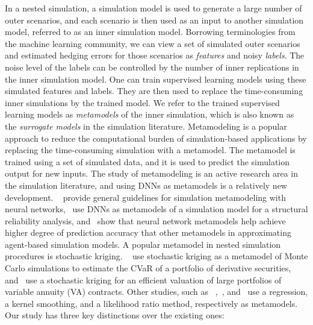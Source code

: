 In a nested simulation, a simulation model is used to generate a large number of outer scenarios, and each scenario is then used as an input to another simulation model, referred to as an inner simulation model.
Borrowing terminologies from the machine learning community, we can view a set of simulated outer scenarios and estimated hedging errors for those scenarios as \textit{features} and noisy \textit{labels}.
The noise level of the labels can be controlled by the number of inner replications in the inner simulation model.
One can train supervised learning models using these simulated features and labels.
They are then used to replace the time-consuming inner simulations by the trained model.
We refer to the trained supervised learning models as \textit{metamodels} of the inner simulation, which is also known as the \textit{surrogate models} in the simulation literature.
Metamodeling is a popular approach to reduce the computational burden of simulation-based applications by replacing the time-consuming simulation with a metamodel.
The metamodel is trained using a set of simulated data, and it is used to predict the simulation output for new inputs.
The study of metamodeling is an active research area in the simulation literature, and using DNNs as metamodels is a relatively new development.
~\cite{fonseca2003simulation} provide general guidelines for simulation metamodeling with neural networks,~\cite{lieu2022adaptive} use DNNs as metamodels of a simulation model for a structural reliability analysis, and~\cite{salle2014efficient} show that neural network metamodels help achieve higher degree of prediction accuracy that other metamodels in approximating agent-based simulation models.
A popular metamodel in nested simulation procedures is stochastic kriging.
~\cite{liu2010stochastic} use stochastic kriging as a metamodel of Monte Carlo simulations to estimate the CVaR of a portfolio of derivative securities, and~\cite{gan2015valuation} use a stochastic kriging for an efficient valuation of large portfolios of variable annuity (VA) contracts.
Other studies, such as ~\cite{broadie2015risk},~\cite{hong2017kernel}, and~\cite{zhang2022sample} use a regression, a kernel smoothing, and a likelihood ratio method, respectively as metamodels.
Our study has three key distinctions over the existing ones:
